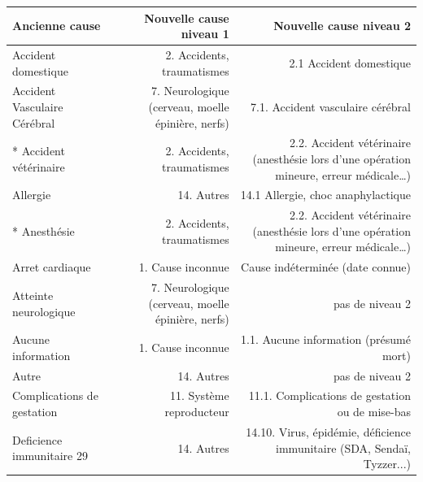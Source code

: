 ﻿\documentclass[a4paper,10pt]{article}
\begin{document}
\begin{tabularx}{\textwidth}{|l|R|R|}\hline
\textbf{Ancienne cause} & \textbf{Nouvelle cause niveau 1} & \textbf{Nouvelle cause niveau 2}\\\hline
Accident domestique & 2. Accidents, traumatismes & 2.1 Accident domestique \\\hline
Accident Vasculaire Cérébral & 7. Neurologique (cerveau, moelle épinière, nerfs) & 7.1. Accident vasculaire cérébral\\\hline
* Accident vétérinaire & 2. Accidents, traumatismes & 2.2. Accident vétérinaire (anesthésie lors d’une opération mineure, erreur médicale…)\\\hline
Allergie & 14. Autres & 14.1 Allergie, choc anaphylactique\\\hline
* Anesthésie & 2. Accidents, traumatismes & 2.2. Accident vétérinaire (anesthésie lors d’une opération mineure, erreur médicale…)\\\hline
Arret cardiaque & 1. Cause inconnue & Cause indéterminée (date connue)\\\hline
Atteinte neurologique & 7. Neurologique (cerveau, moelle épinière, nerfs) & pas de niveau 2\\\hline
Aucune information & 1. Cause inconnue & 1.1. Aucune information (présumé mort)\\\hline
Autre & 14. Autres & pas de niveau 2\\\hline
Complications de gestation & 11. Système reproducteur & 11.1. Complications de gestation ou de mise-bas\\\hline
Deficience immunitaire 29 & 14. Autres & 14.10. Virus, épidémie, déficience immunitaire (SDA, Sendaï, Tyzzer...)\\\hline
\end{tabularx}
\end{document}
